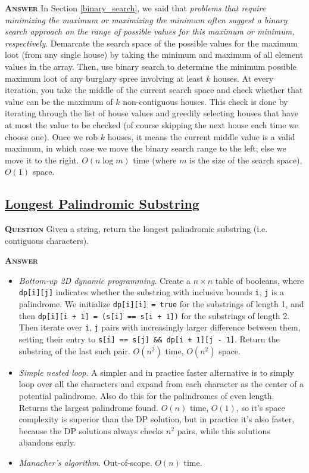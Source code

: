 \documentclass[table, xcdraw]{article}%
\begin{document}
\textsc{\textbf{Answer}} In Section \ref{binary_search}, we said that \textit{problems that require minimizing the maximum or maximizing the minimum often suggest a binary search approach on the range of possible values for this maximum or minimum, respectively}. Demarcate the search space of the possible values for the maximum loot (from any single house) by taking the minimum and maximum of all element values in the array. Then, use binary search to determine the minimum possible maximum loot of any burglary spree involving at least $k$ houses. At every iteration, you take the middle of the current search space and check whether that value can be the maximum of $k$ non-contiguous houses. This check is done by iterating through the list of house values and greedily selecting houses that have at most the value to be checked (of course skipping the next house each time we choose one). Once we rob $k$ houses, it means the current middle value is a valid maximum, in which case we move the binary search range to the left; else we move it to the right. $O(n \log m)$ time (where $m$ is the size of the search space), $O(1)$ space.

\subsection{\href{https://leetcode.com/problems/longest-palindromic-substring}{Longest Palindromic Substring}}

\textsc{\textbf{Question}} Given a string, return the longest palindromic substring (i.e. contiguous characters).

\textsc{\textbf{Answer}}

\begin{itemize}
    \item \textit{Bottom-up 2D dynamic programming}. Create a $n \times n$ table of booleans, where \texttt{dp[i][j]} indicates whether the substring with inclusive bounds \texttt{i}, \texttt{j} is a palindrome. We initialize \texttt{dp[i][i] = true} for the substrings of length 1, and then \texttt{dp[i][i + 1] = (s[i] == s[i + 1])} for the substrings of length 2. Then iterate over \texttt{i}, \texttt{j} pairs with increasingly larger difference between them, setting their entry to \texttt{s[i] == s[j] && dp[i + 1][j - 1]}. Return the substring of the last such pair. $O(n^2)$ time, $O(n^2)$ space.
    \item \textit{Simple nested loop}. A simpler and in practice faster alternative is to simply loop over all the characters and expand from each character as the center of a potential palindrome. Also do this for the palindromes of even length. Returns the largest palindrome found. $O(n)$ time, $O(1)$, so it's space complexity is superior than the DP solution, but in practice it's also faster, because the DP solutions always checks $n^2$ pairs, while this solutions abandons early.
    \item \textit{Manacher's algorithm}. Out-of-scope. $O(n)$ time.
\end{itemize}
\end{document}
